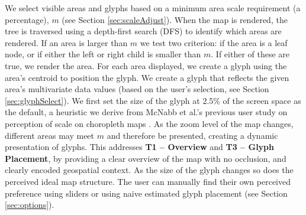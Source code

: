 We select visible areas and glyphs based on a minimum area scale requirement (a percentage), $m$ (see Section \ref{sec:scaleAdjust}). When the map is rendered, the tree is traversed using a depth-first search (DFS) to identify which areas are rendered. If an area is larger than $m$ we test two criterion: if the area is a leaf node, or if either the left or right child is smaller than $m$. If either of these are true, we render the area. For each area displayed, we create a glyph using the area's centroid to position the glyph. We create a glyph that reflects the given area's multivariate data values (based on the user's selection, see Section \ref{sec:glyphSelect}). We first set the size of the glyph at 2.5\% of the screen space as the default, a heuristic we derive from McNabb et al.'s previous user study on perception of scale on choropleth maps \cite{mcnabb2018when}. As the zoom level of the map changes, different areas may meet $m$ and therefore be presented, creating a dynamic presentation of glyphs. This addresses \textbf{T1 -- Overview} and \textbf{T3 -- Glyph Placement}, by providing a clear overview of the map with no occlusion, and clearly encoded geospatial context. As the size of the glyph changes so does the perceived ideal map structure. The user can manually find their own perceived preference using sliders or using naive estimated glyph placement (see Section \ref{sec:options}).

